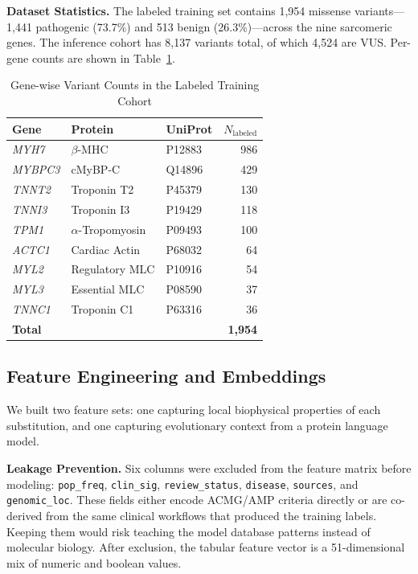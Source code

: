 \documentclass[conference]{IEEEtran}
\begin{document}
\vspace{2mm}\noindent\textbf{Dataset Statistics.}
The labeled training set contains 1,954 missense variants---1,441 pathogenic (73.7\%) and 513 benign (26.3\%)---across the nine sarcomeric genes. The inference cohort has 8,137 variants total, of which 4,524 are VUS. Per-gene counts are shown in Table~\ref{tab:cohort}.

\begin{table}[h]
\centering
\caption{Gene-wise Variant Counts in the Labeled Training Cohort}
\label{tab:cohort}
\begin{tabular}{lllr}
\toprule
\textbf{Gene} & \textbf{Protein} & \textbf{UniProt} & $N_{\mathrm{labeled}}$ \\
\midrule
\textit{MYH7}   & $\beta$-MHC           & P12883 & 986 \\
\textit{MYBPC3} & cMyBP-C               & Q14896 & 429 \\
\textit{TNNT2}  & Troponin T2           & P45379 & 130 \\
\textit{TNNI3}  & Troponin I3           & P19429 & 118 \\
\textit{TPM1}   & $\alpha$-Tropomyosin  & P09493 & 100 \\
\textit{ACTC1}  & Cardiac Actin         & P68032 &  64 \\
\textit{MYL2}   & Regulatory MLC        & P10916 &  54 \\
\textit{MYL3}   & Essential MLC         & P08590 &  37 \\
\textit{TNNC1}  & Troponin C1           & P63316 &  36 \\
\midrule
\textbf{Total}  &                       &        & \textbf{1,954} \\
\bottomrule
\end{tabular}
\end{table}

\subsection{Feature Engineering and Embeddings}

We built two feature sets: one capturing local biophysical properties of each substitution, and one capturing evolutionary context from a protein language model.

\vspace{2mm}\noindent\textbf{Leakage Prevention.}
Six columns were excluded from the feature matrix before modeling: \texttt{pop\_freq}, \texttt{clin\_sig}, \texttt{review\_status}, \texttt{disease}, \texttt{sources}, and \texttt{genomic\_loc}. These fields either encode ACMG/AMP criteria directly or are co-derived from the same clinical workflows that produced the training labels. Keeping them would risk teaching the model database patterns instead of molecular biology. After exclusion, the tabular feature vector is a 51-dimensional mix of numeric and boolean values.
\end{document}
